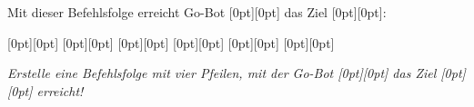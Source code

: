 {Mit dieser Befehlsfolge erreicht Go-Bot \raisebox{-0.5ex}[0pt][0pt]{} das Ziel \raisebox{-0.5ex}[0pt][0pt]{}:

{\centering%
\raisebox{-0.5ex}[0pt][0pt]{} \raisebox{-0.5ex}[0pt][0pt]{}   \raisebox{-0.5ex}[0pt][0pt]{} \raisebox{-0.5ex}[0pt][0pt]{}   \raisebox{-0.5ex}[0pt][0pt]{} \raisebox{-0.5ex}[0pt][0pt]{}

{\centering%
\par}\par}



{\em
Erstelle eine Befehlsfolge mit vier Pfeilen, mit der Go-Bot \raisebox{-0.5ex}[0pt][0pt]{} das Ziel \raisebox{-0.5ex}[0pt][0pt]{} erreicht!

{\centering%
{\centering%
\par}

{\centering%
\par}\par}


}



}
